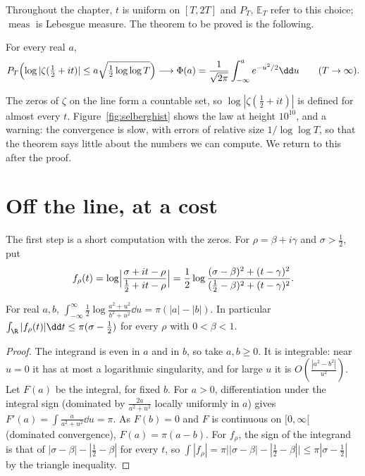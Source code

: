 Throughout the chapter, $t$ is uniform on $[T,2T]$ and $P_T$, $\mathbb E_T$ refer to this choice; $\operatorname{meas}$ is Lebesgue measure. The theorem to be proved is the following.

\begin{theorem}[Selberg, 1946]\label{thm:selberg}
For every real $a$,
\[
P_T\Bigl(\log|\zeta(\tfrac12+it)|\le a\sqrt{\tfrac12\log\log T}\Bigr)\longrightarrow\Phi(a)=\frac1{\sqrt{2\pi}}\int_{-\infty}^ae^{-u^2/2}\dd u\qquad(T\to\infty).
\]
\end{theorem}

The zeros of $\zeta$ on the line form a countable set, so $\log|\zeta(\frac12+it)|$ is defined for almost every $t$. Figure~\ref{fig:selberghist} shows the law at height $10^{10}$, and a warning: the convergence is slow, with errors of relative size $1/\log\log T$, so that the theorem says little about the numbers we can compute. We return to this after the proof.

\section{Off the line, at a cost}

The first step is a short computation with the zeros. For $\rho=\beta+i\gamma$ and $\sigma>\frac12$, put
\[
f_\rho(t)=\log\Bigl|\frac{\sigma+it-\rho}{\frac12+it-\rho}\Bigr|=\frac12\log\frac{(\sigma-\beta)^2+(t-\gamma)^2}{(\frac12-\beta)^2+(t-\gamma)^2}.
\]

\begin{lemma}\label{lem:logint}
For real $a,b$, $\displaystyle\int_{-\infty}^\infty\frac12\log\frac{a^2+u^2}{b^2+u^2}\dd u=\pi(|a|-|b|)$. In particular $\int_\R|f_\rho(t)|\dd t\le\pi(\sigma-\frac12)$ for every $\rho$ with $0<\beta<1$.
\end{lemma}
\begin{proof}
The integrand is even in $a$ and in $b$, so take $a,b\ge0$. It is integrable: near $u=0$ it has at most a logarithmic singularity, and for large $u$ it is $O(\frac{|a^2-b^2|}{u^2})$. Let $F(a)$ be the integral, for fixed $b$. For $a>0$, differentiation under the integral sign (dominated by $\frac{2a}{a^2+u^2}$ locally uniformly in $a$) gives $F'(a)=\int\frac a{a^2+u^2}\dd u=\pi$. As $F(b)=0$ and $F$ is continuous on $[0,\infty[$ (dominated convergence), $F(a)=\pi(a-b)$. For $f_\rho$, the sign of the integrand is that of $|\sigma-\beta|-|\frac12-\beta|$ for every $t$, so $\int|f_\rho|=\pi\bigl||\sigma-\beta|-|\frac12-\beta|\bigr|\le\pi|\sigma-\frac12|$ by the triangle inequality.
\end{proof}

